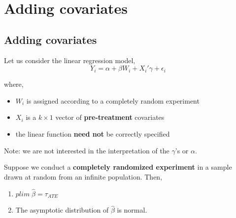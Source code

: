 \documentclass[
  letterpaper,
  DIV=11,
  numbers=noendperiod]{scrreprt}
\providecommand{\tightlist}{%
  \setlength{\itemsep}{0pt}\setlength{\parskip}{0pt}}\usepackage{longtable,booktabs,array}
\theoremstyle{definition}
\theoremstyle{remark}
\begin{document}
\section{Adding covariates}\label{adding-covariates}

\subsection{Adding covariates}\label{adding-covariates-1}

Let us consider the linear regression model, \[
            Y_i = \alpha+\beta W_i + X_i'\gamma+\epsilon_i
\]

where,

\par

\begin{itemize}
\tightlist
\item
  \(W_i\) is assigned according to a completely random experiment
\item
  \(X_i\) is a \(k\times 1\) vector of \textbf{pre-treatment} covariates
\item
  the linear function \textbf{need not} be correctly specified
\end{itemize}

Note: we are not interested in the interpretation of the \(\gamma\)'s or
\(\alpha\).

\begin{tcolorbox}[enhanced jigsaw, bottomrule=.15mm, coltitle=black, arc=.35mm, left=2mm, opacityback=0, leftrule=.75mm, colbacktitle=quarto-callout-important-color!10!white, title={Theorem (Imbens and Rubin, 2015, p.123)}, toprule=.15mm, bottomtitle=1mm, breakable, colframe=quarto-callout-important-color-frame, opacitybacktitle=0.6, titlerule=0mm, colback=white, rightrule=.15mm, toptitle=1mm]

Suppose we conduct a \textbf{completely randomized experiment} in a
sample drawn at random from an infinite population. Then,

\par

\begin{enumerate}
\def\labelenumi{\arabic{enumi}.}
\tightlist
\item
  \(plim\;\hat{\beta}=\tau_{ATE}\)
\item
  The asymptotic distribution of \(\hat{\beta}\) is normal.
\end{enumerate}

\end{tcolorbox}
\end{document}
